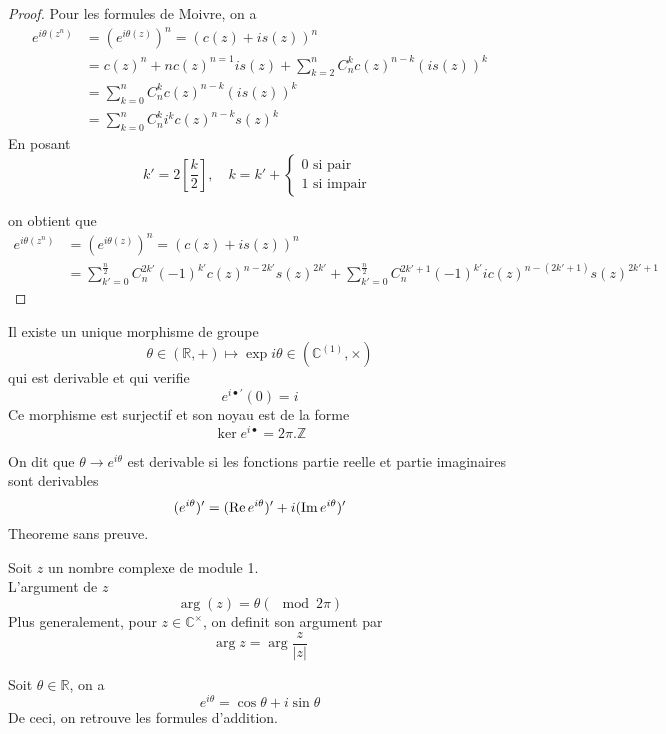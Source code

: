 \documentclass[../main.tex]{subfiles}
\begin{document}
\begin{proof}
Pour les formules de Moivre, on a 
\begin{align*}
	e^{i\theta( z^{n}) } &= ( e^{i\theta( z) } )^{n} = ( c( z) + i s( z) ) ^{n}\\
			     &= c( z) ^{n}+ n c( z) ^{n=1}i s( z)  + \sum_{k=2}^{ n}C_n^{k} c( z) ^{n-k}( i s( z) ) ^{k}\\
			     &= \sum_{k=0}^{ n}C_n^{k}c( z) ^{n-k}( i s( z) ) ^{k}\\
			     &= \sum_{k=0}^{ n} C_n^{k} i ^{k} c( z) ^{n-k} s( z) ^{k}	
\end{align*}
En posant
\[ 
k' = 2 [ \frac{k}{2}] ,\quad k = k' + 
\begin{cases}
0 \text{ si pair } \\
1 \text{ si impair } 
\end{cases}
\]

on obtient que
\begin{align*}
	e^{i\theta( z^{n}) } &= ( e^{i \theta( z) }) ^{n}= ( c( z) + i s( z) ) ^{n}\\
			     &= \sum_{k'=0}^{ \frac{n}{2}} C_n^{2k'} ( -1) ^{k'} c( z) ^{n-2k'} s( z) ^{2k'}
			     + \sum_{k'=0}^{ \frac{n}{2}} C_n^{2k'+1} ( -1) ^{k'} i c( z) ^{n- ( 2k'+1) } s( z) ^{2k'+1}	
\end{align*}


\end{proof}
\begin{thm}
Il existe un unique morphisme de groupe
\[ 
	\theta \in ( \mathbb{R}, +) \mapsto \exp i \theta \in ( \mathbb{C}^{( 1) }, \times) 
\]
qui est derivable et qui verifie
\[ 
	e^{i \bullet'}( 0) = i
\]
Ce morphisme est surjectif et son noyau est de la forme
\[ 
\ker e^{i \bullet} = 2\pi. \mathbb{Z}
\]

\end{thm}
On dit que  $\theta \to e^{i \theta}$ est derivable si les fonctions partie reelle et partie imaginaires sont derivables
\[ 
	( e^{i\theta})' = ( \operatorname*{Re} e^{i\theta} )' + i( \operatorname*{Im} e^{i\theta} )'
\]
Theoreme sans preuve.
\begin{defn}
Soit $z$ un nombre complexe de module 1.\\
L'argument de $z$ 
\[ 
	\arg ( z)  = \theta ( \mod 2\pi) 
\]
Plus generalement, pour $z\in \mathbb{C}^{\times}$, on definit son argument par 
\[ 
\arg z = \arg \frac{z}{|z|}
\]


\end{defn}
\begin{defn}
Soit $\theta \in \mathbb{R}$, on a 
\[ 
e^{i\theta } = \cos \theta + i \sin \theta
\]
De ceci, on retrouve les formules d'addition.

\end{defn}
\end{document}
